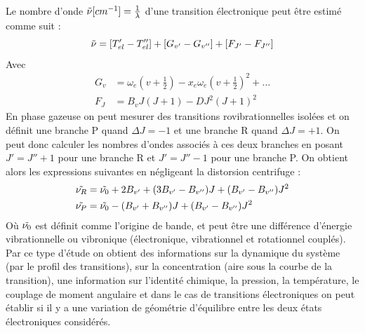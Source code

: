 Le nombre d'onde $\Tilde{\nu}[cm^{-1}]=\frac{1}{\lambda}$ d'une transition électronique peut être estimé comme suit :
\begin{equation*}
    \Tilde{\nu} = [T_{el}'-T_{el}''] + [G_{v'}-G_{v''}] + [F_{J'}-F_{J''}]
\end{equation*}
Avec
\begin{equation*}
    \begin{split}
        G_v &= \omega_e(v+\frac{1}{2})-x_e\omega_e(v+\frac{1}{2})^2 + \hdots\\
        F_J &= B_vJ(J+1) - DJ^2(J+1)^2
    \end{split}
\end{equation*}
En phase gazeuse on peut mesurer des transitions rovibrationnelles isolées et on définit une branche P quand $\Delta J =-1$ et une branche R quand $\Delta J =+1$. On peut donc calculer les nombres d'ondes associés à ces deux branches en posant $J' = J''+1$ pour une branche R et $J' = J'' - 1$ pour une branche P. On obtient alors les expressions suivantes en négligeant la distorsion centrifuge :
\begin{equation*}
    \begin{split}
        \Tilde{\nu_R} &= \Tilde{\nu_0} + 2B_{v'} + (3B_{v'}-B_{v''})J + (B_{v'}-B_{v''})J^2\\
        \Tilde{\nu_P} &= \Tilde{\nu_0} - (B_{v'}+B_{v''})J + (B_{v'}-B_{v''})J^2
    \end{split}
\end{equation*}
Où $\Tilde{\nu_0}$ est définit comme l'origine de bande, et peut être une différence d'énergie vibrationnelle ou vibronique (électronique, vibrationnel et rotationnel couplés).\newline
Par ce type d’étude on obtient des informations sur la dynamique du système (par le profil des transitions), sur la concentration (aire sous la courbe de la transition), une information sur l’identité chimique, la pression, la température, le couplage de moment angulaire et dans le cas de transitions électroniques on peut établir si il y a une variation de géométrie d’équilibre entre les deux états électroniques considérés.





\clearpage